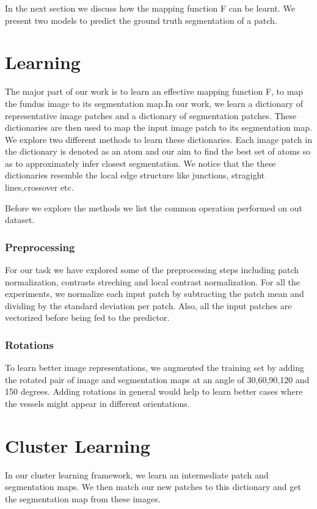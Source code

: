 In the next section we discuss how the mapping function F can be learnt. We present two models to predict the ground truth segmentation of a patch.


\section{Learning}
The major part of our work is to learn an effective mapping function F, to map the fundus image to its segmentation map.In our work, we learn a dictionary of representative image patches and a dictionary of segmentation patches. These dictionaries are then used to map the input image patch to its segmentation map. We explore two different methods to learn these dictionaries. Each image patch in the dictionary is denoted as an atom and our aim to find the best set of atoms so as to approximately infer closest segmentation. We notice that the these dictionaries resemble the local edge structure like junctions, stragight lines,crossover etc.

Before we explore the methods we list the common operation performed on out dataset.
 
\subsubsection{Preprocessing}
For our task we have explored some of the preprocessing steps including patch normalization, contrasts streching and local contrast normalization.
For all the experiments, we normalize each input patch by subtracting the patch mean and dividing by the standard deviation per patch. Also, all the input patches are vectorized before being fed to the predictor.

\subsubsection{Rotations}
To learn better image representations, we augmented the training set by adding the rotated pair of image and segmentation maps at an angle of 30,60,90,120 and 150 degrees. Adding rotations in general would help to learn better cases where the vessels might appear in different orientations.

\section{Cluster Learning}
In our cluster learning framework, we learn an intermediate patch and segmentation maps. We then match our new patches to this dictionary and get the segmentation map from these images.
